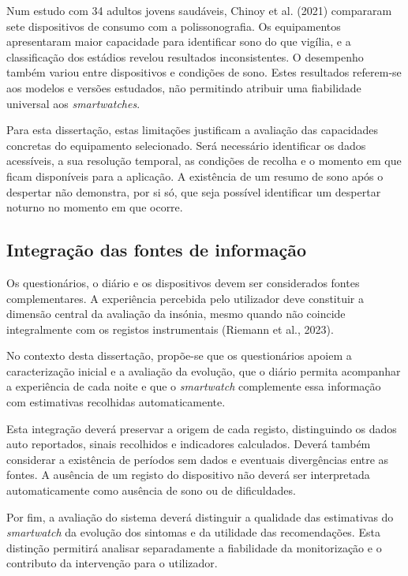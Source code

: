 Num estudo com 34 adultos jovens saudáveis, Chinoy et al. (2021) compararam sete dispositivos de consumo com a polissonografia. Os equipamentos apresentaram maior capacidade para identificar sono do que vigília, e a classificação dos estádios revelou resultados inconsistentes. O desempenho também variou entre dispositivos e condições de sono. Estes resultados referem-se aos modelos e versões estudados, não permitindo atribuir uma fiabilidade universal aos \textit{smartwatches}.

Para esta dissertação, estas limitações justificam a avaliação das capacidades concretas do equipamento selecionado. Será necessário identificar os dados acessíveis, a sua resolução temporal, as condições de recolha e o momento em que ficam disponíveis para a aplicação. A existência de um resumo de sono após o despertar não demonstra, por si só, que seja possível identificar um despertar noturno no momento em que ocorre.

\subsection{Integração das fontes de informação}
\label{sec:chap2_integration}

Os questionários, o diário e os dispositivos devem ser considerados fontes complementares. A experiência percebida pelo utilizador deve constituir a dimensão central da avaliação da insónia, mesmo quando não coincide integralmente com os registos instrumentais (Riemann et al., 2023).

No contexto desta dissertação, propõe-se que os questionários apoiem a caracterização inicial e a avaliação da evolução, que o diário permita acompanhar a experiência de cada noite e que o \textit{smartwatch} complemente essa informação com estimativas recolhidas automaticamente.

Esta integração deverá preservar a origem de cada registo, distinguindo os dados auto reportados, sinais recolhidos e indicadores calculados. Deverá também considerar a existência de períodos sem dados e eventuais divergências entre as fontes. A ausência de um registo do dispositivo não deverá ser interpretada automaticamente como ausência de sono ou de dificuldades.

Por fim, a avaliação do sistema deverá distinguir a qualidade das estimativas do \textit{smartwatch} da evolução dos sintomas e da utilidade das recomendações. Esta distinção permitirá analisar separadamente a fiabilidade da monitorização e o contributo da intervenção para o utilizador.

